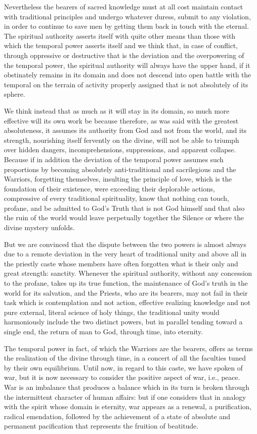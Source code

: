 Nevertheless the bearers of sacred knowledge must at all cost maintain contact with traditional principles and undergo whatever duress, submit to any violation, in order to continue to save men by getting them back in touch with the eternal. The spiritual authority asserts itself with quite other means than those with which the temporal power asserts itself and we think that, in case of conflict, through oppressive or destructive that is the deviation and the overpowering of the temporal power, the spiritual authority will always have the upper hand, if it obstinately remains in its domain and does not descend into open battle with the temporal on the terrain of activity properly assigned that is not absolutely of its sphere.

We think instead that as much as it will stay in its domain, so much more effective will its own work be because therefore, as was said with the greatest absoluteness, it assumes its authority from God and not from the world, and its strength, nourishing itself fervently on the divine, will not be able to triumph over hidden dangers, incomprehensions, suppressions, and apparent collapse. Because if in addition the deviation of the temporal power assumes such proportions by becoming absolutely anti-traditional and sacrilegious and the Warriors, forgetting themselves, insulting the principle of love, which is the foundation of their existence, were exceeding their deplorable actions, compressive of every traditional spirituality, know that nothing can touch, profane, and be admitted to God's Truth that is not God himself and that also the ruin of the world would leave perpetually together the Silence or where the divine mystery unfolds.

But we are convinced that the dispute between the two powers is almost always due to a remote deviation in the very heart of traditional unity and above all in the priestly caste whose members have often forgotten what is their only and great strength: sanctity. Whenever the spiritual authority, without any concession to the profane, takes up its true function, the maintenance of God's truth in the world for its salvation, and the Priests, who are its bearers, may not fail in their task which is contemplation and not action, effective realizing knowledge and not pure external, literal science of holy things, the traditional unity would harmoniously include the two distinct powers, but in parallel tending toward a single end, the return of man to God, through time, into eternity.

The temporal power in fact, of which the Warriors are the bearers, offers as terms the realization of the divine through time, in a concert of all the faculties tuned by their own equilibrium. Until now, in regard to this caste, we have spoken of war, but it is now necessary to consider the positive aspect of war, i.e., peace. War is an imbalance that produces a balance which in its turn is broken through the intermittent character of human affairs: but if one considers that in analogy with the spirit whose domain is eternity, war appears as a renewal, a purification, radical emendation, followed by the achievement of a state of absolute and permanent pacification that represents the fruition of beatitude.

